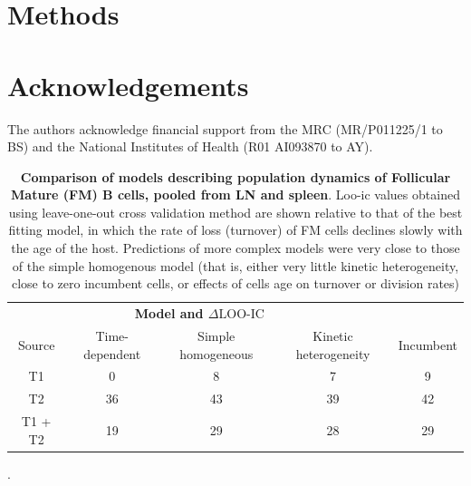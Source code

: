 \documentclass[11pt,onecolumn]{article}
\newcommand{\looic}{\ensuremath{\Delta \text{LOO-IC}}}
\begin{document}
\section*{Methods}


\section*{Acknowledgements}
The authors acknowledge financial support from the MRC (MR/P011225/1 to BS) and the National Institutes of Health (R01 AI093870 to AY). 



\nolinenumbers %
 

{\small 

}


\clearpage

	\begin{table}[h!]
		\begin{center}
			\renewcommand{\arraystretch}{1.25}
			\begin{tabular}{c c c c c} 
				\toprule 
				\multicolumn{4}{c}{\textbf{Model and {\looic}}} \\
				\cline{2-5}
				Source &{\small Time-dependent}  & {\small Simple homogeneous} &  {\small Kinetic heterogeneity} & {\small Incumbent} \\ 
				\toprule
				T1    &   0             &              8             &                7              &          9         \\ 
				T2    &   36            &              43            &                39             &          42        \\ 
				T1 + T2 &   19          &              29            &                28             &          29        \\ 
				\hline
				\toprule 
			\end{tabular}
		\end{center}
		\caption{\small \textbf{Comparison of models describing population dynamics of Follicular Mature (FM) B cells, pooled from LN and spleen}. Loo-ic values obtained using leave-one-out cross validation method are shown relative to that of the best fitting model, in which the rate of loss  (turnover) of FM cells declines slowly with the age of the host. Predictions of more complex models were very close to those of the simple homogenous model (that is, either very little kinetic heterogeneity, close to zero incumbent cells, or effects of cells age on turnover or division rates)}. 
		\label{tab:FM-AICs}
	\end{table} 
	
\end{document}
